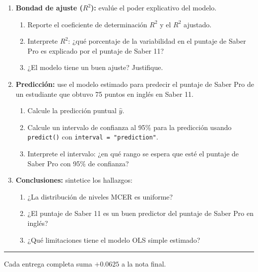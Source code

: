 \documentclass[11pt, a4paper]{article}
\begin{document}
\begin{enumerate}[label=\arabic*)]
  \item \textbf{Bondad de ajuste ($R^2$):} eval\'ue el poder explicativo del
        modelo.
        \begin{enumerate}[label=\alph*)]
          \item Reporte el coeficiente de determinaci\'on $R^2$ y el $R^2$
                ajustado.
          \item Interprete $R^2$: ¿qu\'e porcentaje de la variabilidad en el
                puntaje de Saber Pro es explicado por el puntaje de Saber 11?
          \item ¿El modelo tiene un buen ajuste? Justifique.
        \end{enumerate}

  \item \textbf{Predicci\'on:} use el modelo estimado para predecir el puntaje
        de Saber Pro de un estudiante que obtuvo 75 puntos en ingl\'es
        en Saber 11.
        \begin{enumerate}[label=\alph*)]
          \item Calcule la predicci\'on puntual $\hat{y}$.
          \item Calcule un intervalo de confianza al 95\% para la predicci\'on
                usando \texttt{predict()} con \texttt{interval = "prediction"}.
          \item Interprete el intervalo: ¿en qu\'e rango se espera que est\'e
                el puntaje de Saber Pro con 95\% de confianza?
        \end{enumerate}

  \item \textbf{Conclusiones:} sintetice los hallazgos:
        \begin{enumerate}[label=\alph*)]
          \item ¿La distribuci\'on de niveles MCER es uniforme?
          \item ¿El puntaje de Saber 11 es un buen predictor del puntaje de
                Saber Pro en ingl\'es?
          \item ¿Qu\'e limitaciones tiene el modelo OLS simple estimado?
        \end{enumerate}
\end{enumerate}

\vspace{10pt}
\rule{\linewidth}{0.4pt}
\begin{center}
{\small Cada entrega completa suma $+0.0625$ a la nota final.}
\end{center}
\end{document}

